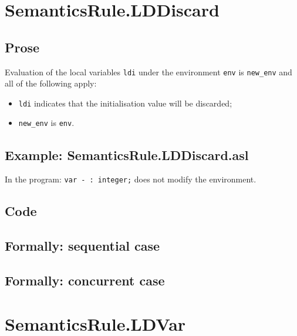 \documentclass{book}
\begin{document}
\section{SemanticsRule.LDDiscard \label{sec:SemanticsRule.LDDiscard}}

    \subsection{Prose}
Evaluation of the local variables \texttt{ldi} under the environment
\texttt{env} is \texttt{new\_env} and all of the following apply:
    \begin{itemize}
    \item \texttt{ldi} indicates that the initialisation value will be discarded;
    \item \texttt{new\_env} is \texttt{env}.
    \end{itemize}

    \subsection{Example: SemanticsRule.LDDiscard.asl}
    In the program:
    \texttt{var - : integer;} does not modify the environment.

  \subsection{Code}

\begin{emptyformal}
  \subsection{Formally: sequential case}

  \subsection{Formally: concurrent case}
\end{emptyformal}


\section{SemanticsRule.LDVar \label{sec:SemanticsRule.LDVar}}
\end{document}
